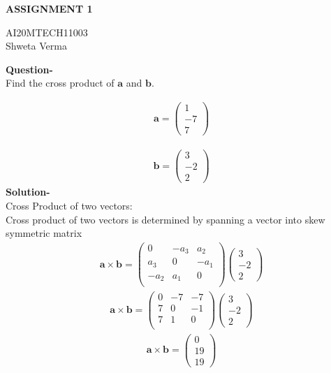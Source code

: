 \documentclass[11pt]{article}
\newcommand{\myvec}[1]{\ensuremath{\begin{pmatrix}#1\end{pmatrix}}}
\renewcommand{\vec}[1]{\boldsymbol{#1}}
\begin{document}
\begin{center}
\huge\textbf{ASSIGNMENT 1} 

\Large AI20MTECH11003
\\
\large Shweta Verma
\\

\end{center}
\large\textbf{Question-} 
\\
Find the cross product of $\boldsymbol{a}$ and $\boldsymbol{b}$.


\begin{align*}
\vec{a} = \myvec{1\\-7\\7}
\end{align*}


\begin{align*}
\vec{b} = \myvec{3\\-2\\2}
\end{align*}
\large\textbf{Solution-}
\\
Cross Product of two vectors: 
\\
Cross product of two vectors is determined by spanning a vector into skew symmetric matrix
\begin{align}
\vec{a \times \vec{b}}
=\myvec
   {0 & -a_3 & a_2\\
   a_3 & 0 & -a_1\\
   -a_2 & a_1 & 0\\}
  \myvec{3\\-2\\2}
\end{align}
\begin{align}
\vec{a \times \vec{b}}
= \myvec
  {0 & -7 & -7\\
  7 & 0 & -1\\
  7 & 1 & 0\\}
 \myvec{3\\-2\\2}
\end{align}
\begin{align}
\vec{a \times \vec{b}}
=\myvec{0\\19\\19}
\end{align}
\end{document}
